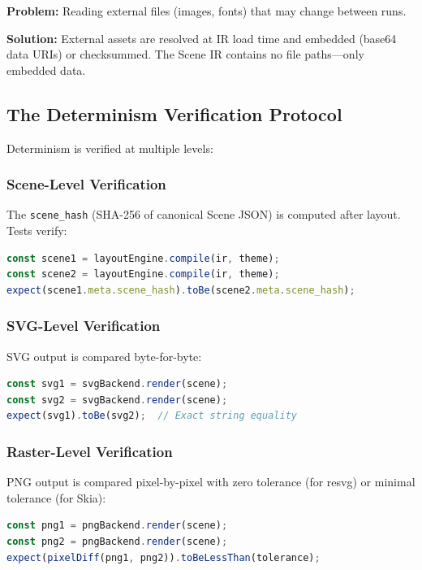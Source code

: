 \textbf{Problem:} Reading external files (images, fonts) that may change between runs.

\textbf{Solution:} External assets are resolved at IR load time and embedded (base64 data URIs) or checksummed. The Scene IR contains no file paths---only embedded data.

\subsection{The Determinism Verification Protocol}

Determinism is verified at multiple levels:

\subsubsection{Scene-Level Verification}

The \texttt{scene\_hash} (SHA-256 of canonical Scene JSON) is computed after layout. Tests verify:

\begin{lstlisting}[language=javascript,caption={Scene determinism test pattern}]
const scene1 = layoutEngine.compile(ir, theme);
const scene2 = layoutEngine.compile(ir, theme);
expect(scene1.meta.scene_hash).toBe(scene2.meta.scene_hash);
\end{lstlisting}

\subsubsection{SVG-Level Verification}

SVG output is compared byte-for-byte:

\begin{lstlisting}[language=javascript,caption={SVG determinism test pattern}]
const svg1 = svgBackend.render(scene);
const svg2 = svgBackend.render(scene);
expect(svg1).toBe(svg2);  // Exact string equality
\end{lstlisting}

\subsubsection{Raster-Level Verification}

PNG output is compared pixel-by-pixel with zero tolerance (for resvg) or minimal tolerance (for Skia):

\begin{lstlisting}[language=javascript,caption={Raster determinism test pattern}]
const png1 = pngBackend.render(scene);
const png2 = pngBackend.render(scene);
expect(pixelDiff(png1, png2)).toBeLessThan(tolerance);
\end{lstlisting}

